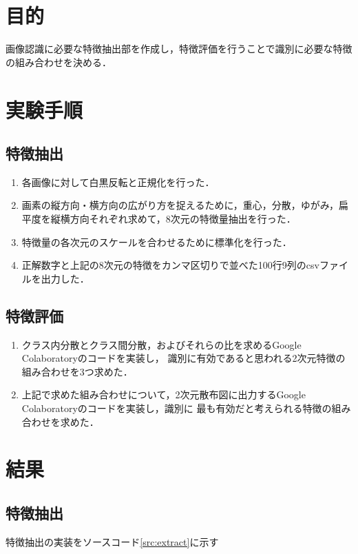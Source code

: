 \documentclass{jlreq}
\numberwithin{equation}{section}
\begin{document}
\tableofcontents
\clearpage

\section{目的}
画像認識に必要な特徴抽出部を作成し，特徴評価を行うことで識別に必要な特徴の組み合わせを決める．

\section{実験手順}
\subsection{特徴抽出}
\begin{enumerate}
  \item 各画像に対して白黒反転と正規化を行った．
  \item 画素の縦方向・横方向の広がり方を捉えるために，重心，分散，ゆがみ，扁平度を縦横方向それぞれ求めて，8次元の特徴量抽出を行った．
  \item 特徴量の各次元のスケールを合わせるために標準化を行った．
  \item 正解数字と上記の8次元の特徴をカンマ区切りで並べた100行9列のcsvファイルを出力した．
\end{enumerate}

\subsection{特徴評価}
\begin{enumerate}
  \item クラス内分散とクラス間分散，およびそれらの比を求めるGoogle Colaboratoryのコードを実装し，
        識別に有効であると思われる2次元特徴の組み合わせを3つ求めた．
  \item 上記で求めた組み合わせについて，2次元散布図に出力するGoogle Colaboratoryのコードを実装し，識別に
        最も有効だと考えられる特徴の組み合わせを求めた．
\end{enumerate}

\section{結果}
\subsection{特徴抽出}
特徴抽出の実装をソースコード\ref{src:extract}に示す
\end{document}
